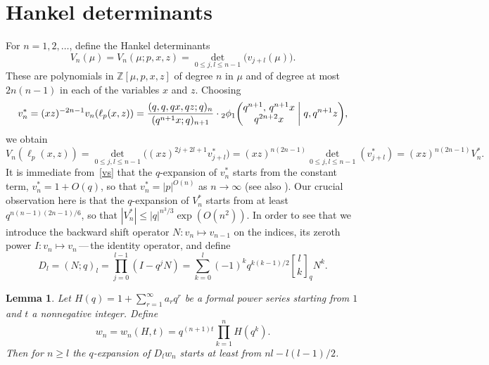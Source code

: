 \documentclass[12pt,reqno]{amsart}
\newtheorem{lemma}{Lemma}
\theoremstyle{remark}
\newcommand{\qbinom}[2]{{\genfrac{[}{]}{0pt}{}{#1}{#2}}_q}
\begin{document}
\section{Hankel determinants}
\label{s4}

For $n=1,2,\dots$, define the Hankel determinants
$$
V_n(\mu)=V_n(\mu;p,x,z)=\det_{0\le j,l\le n-1}\bigl(v_{j+l}(\mu)\bigr).
$$
These are polynomials in $\mathbb Z[\mu,p,x,z]$ of degree $n$ in $\mu$ and of degree at most $2n(n-1)$ in each of the variables $x$ and $z$.
Choosing
\begin{equation}
v_n^*=(xz)^{-2n-1}v_n(\ell_p(x,z))
=\frac{(q,q,qx,qz;q)_n}{(q^{n+1}x;q)_{n+1}}
\cdot{}_2\phi_1\biggl(\begin{matrix} q^{n+1}, \, q^{n+1}x \\ q^{2n+2}x \end{matrix} \biggm|q,q^{n+1}z\biggr),
\label{vs}
\end{equation}
we obtain
$$
V_n(\ell_p(x,z))
=\det_{0\le j,l\le n-1}\bigl((xz)^{2j+2l+1}v_{j+l}^*\bigr)
=(xz)^{n(2n-1)}\det_{0\le j,l\le n-1}(v_{j+l}^*)
=(xz)^{n(2n-1)}V_n^*.
$$
It is immediate from~\eqref{vs} that the $q$-expansion of $v_n^*$ starts from the constant term, $v_n^*=1+O(q)$, so that
$v_n^*=|p|^{O(n)}$ as $n\to\infty$ (see also \cite[Lemma~5]{BZ08}). Our crucial observation here is that the $q$-expansion
of $V_n^*$ starts from at least $q^{n(n-1)(2n-1)/6}$, so that $|V_n^*|\le|q|^{n^3/3}\exp(O(n^2))$.
In order to see that we introduce the backward shift operator $N\colon v_n\mapsto v_{n-1}$
on the indices, its zeroth power $I\colon v_n\mapsto v_n$\,---\,the identity operator, and define
\begin{equation}
D_l=(N;q)_l=\prod_{j=0}^{l-1}(I-q^jN)=\sum_{k=0}^l(-1)^kq^{k(k-1)/2}\qbinom lkN^k.
\label{Dl}
\end{equation}

\begin{lemma}
\label{lem1}
Let $H(q)=1+\sum_{r=1}^\infty a_rq^r$ be a formal power series starting from $1$ and $t$ a nonnegative integer.
Define
$$
w_n=w_n(H,t)=q^{(n+1)t}\prod_{k=1}^nH(q^k).
$$
Then for $n\ge l$ the $q$-expansion of $D_lw_n$ starts at least from $nl-l(l-1)/2$.
\end{lemma}
\end{document}
